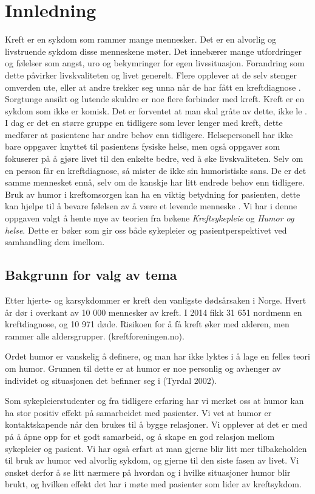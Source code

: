 \chapter{Innledning}

Kreft er en sykdom som rammer mange mennesker. Det er en alvorlig og
livstruende sykdom disse menneskene møter. Det innebærer mange utfordringer og
følelser som angst, uro og bekymringer for egen livssituasjon. Forandring som
dette påvirker livskvaliteten og livet generelt. Flere opplever at de selv
stenger omverden ute, eller at andre trekker seg unna når de har fått en
kreftdiagnose \cite[s.~39-47]{rustoen2008}. Sorgtunge ansikt og lutende skuldre
er noe flere forbinder med kreft. Kreft er en sykdom som ikke er komisk. Det er
forventet at man skal gråte av dette, ikke le \cite[s.~161-162]{tyrdal2002}.  I
dag er det en større gruppe en tidligere som lever lenger med kreft, dette
medfører at pasientene har andre behov enn tidligere. Helsepersonell har ikke
bare oppgaver knyttet til pasientens fysiske helse, men også oppgaver som
fokuserer på å gjøre livet til den enkelte bedre, ved å øke livskvaliteten.
Selv om en person får en kreftdiagnose, så mister de ikke sin humoristiske
sans. De er det samme mennesket ennå, selv om de kanskje har litt endrede behov
enn tidligere. Bruk av humor i kreftomsorgen kan ha en viktig betydning for
pasienten, dette kan hjelpe til å bevare følelsen av å være et levende menneske
\cite[s.~163]{tyrdal2002}. Vi har i denne oppgaven valgt å hente mye av teorien
fra bøkene \textit{Kreftsykepleie} og \textit{Humor og helse}. Dette er bøker
som gir oss både sykepleier og pasientperspektivet ved samhandling dem imellom.

\section{Bakgrunn for valg av tema}

Etter hjerte- og karsykdommer er kreft den vanligste dødsårsaken i Norge. Hvert
år dør i overkant av 10 000 mennesker av kreft. I 2014 fikk 31 651 nordmenn en
kreftdiagnose, og 10 971 døde. Risikoen for å få kreft
øker med alderen, men rammer alle aldersgrupper. (kreftforeningen.no).

Ordet humor er vanskelig å definere, og man har ikke lyktes i å lage en felles
teori om humor. Grunnen til dette er at humor er noe personlig og avhenger av
individet og situasjonen det befinner seg i (Tyrdal 2002).

Som sykepleierstudenter og fra tidligere erfaring har vi merket oss at humor
kan ha stor positiv effekt på samarbeidet med pasienter. Vi vet at humor er
kontaktskapende når den brukes til å bygge relasjoner. Vi opplever at det er
med på å åpne opp for et godt samarbeid, og å skape en god relasjon mellom
sykepleier og pasient. Vi har også erfart at man gjerne blir litt mer
tilbakeholden til bruk av humor ved alvorlig sykdom, og gjerne til den siste
fasen av livet. Vi ønsket derfor å se litt nærmere på hvordan og i hvilke
situasjoner humor blir brukt, og hvilken effekt det har i møte med pasienter
som lider av kreftsykdom.


